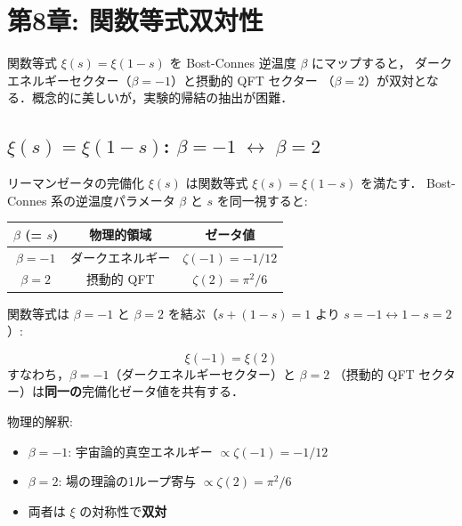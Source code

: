 \documentclass[11pt,a4paper]{article}
\begin{document}
\newpage
\section{第8章: 関数等式双対性}

\begin{statusbox}
関数等式 $\xi(s) = \xi(1-s)$ を Bost-Connes 逆温度 $\beta$ にマップすると，
ダークエネルギーセクター（$\beta = -1$）と摂動的 QFT セクター
（$\beta = 2$）が双対となる．概念的に美しいが，実験的帰結の抽出が困難．
\end{statusbox}

\subsection{$\xi(s) = \xi(1-s)$: $\beta = -1 \;\leftrightarrow\; \beta = 2$}

リーマンゼータの完備化 $\xi(s)$ は関数等式 $\xi(s) = \xi(1-s)$ を満たす．
Bost-Connes 系の逆温度パラメータ $\beta$ と $s$ を同一視すると:

\begin{center}
\begin{tabular}{ccc}
\toprule
$\beta$ (= $s$) & 物理的領域 & ゼータ値 \\
\midrule
$\beta = -1$ & ダークエネルギー & $\zeta(-1) = -1/12$ \\
$\beta = 2$ & 摂動的 QFT & $\zeta(2) = \pi^2/6$ \\
\bottomrule
\end{tabular}
\end{center}

関数等式は $\beta = -1$ と $\beta = 2$ を結ぶ（$s + (1-s) = 1$ より
$s = -1 \leftrightarrow 1-s = 2$）:

\begin{keyresult}[関数等式双対性]
\begin{equation}
\xi(-1) = \xi(2)
\end{equation}
すなわち，$\beta = -1$（ダークエネルギーセクター）と $\beta = 2$
（摂動的 QFT セクター）は\textbf{同一の}完備化ゼータ値を共有する．

物理的解釈:
\begin{itemize}
\item $\beta = -1$: 宇宙論的真空エネルギー $\propto \zeta(-1) = -1/12$
\item $\beta = 2$: 場の理論の1ループ寄与 $\propto \zeta(2) = \pi^2/6$
\item 両者は $\xi$ の対称性で\textbf{双対}
\end{itemize}
\end{keyresult}
\end{document}
